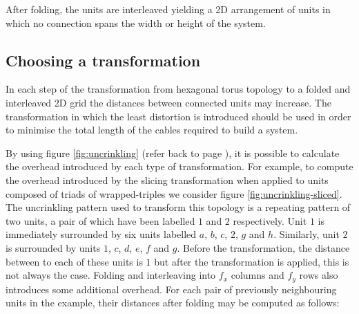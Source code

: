 			After folding, the units are interleaved yielding a 2D arrangement of
			units in which no connection spans the width or height of the system.
		
		\subsection{Choosing a transformation}
			
			\label{sec:distortion}
			
			In each step of the transformation from hexagonal torus topology to a
			folded and interleaved 2D grid the distances between connected units
			may increase. The transformation in which the least distortion is
			introduced should be used in order to minimise the total length of the
			cables required to build a system.
			
			By using figure \ref{fig:uncrinkling} (refer back to page
			\pageref{fig:uncrinkling}), it is possible to calculate the overhead
			introduced by each type of transformation.  For example, to compute the
			overhead introduced by the slicing transformation when applied to units
			composed of triads of wrapped-triples we consider figure
			\ref{fig:uncrinkling-sliced}. The uncrinkling pattern used to transform
			this topology is a repeating pattern of two units, a pair of which have
			been labelled $1$ and $2$ respectively. Unit $1$ is immediately
			surrounded by six units labelled $a$, $b$, $c$, $2$, $g$ and $h$.
			Similarly, unit $2$ is surrounded by units $1$, $c$, $d$, $e$, $f$ and
			$g$. Before the transformation, the distance between to each of these
			units is $1$ but after the transformation is applied, this is not always
			the case. Folding and interleaving into $f_x$ columns and $f_y$ rows also
			introduces some additional overhead. For each pair of previously
			neighbouring units in the example, their distances after folding may be
			computed as follows:
			
